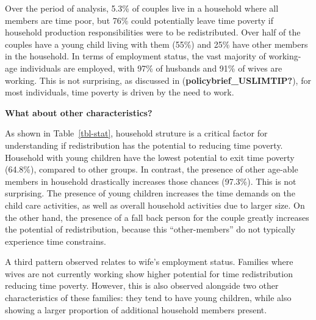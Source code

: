 \documentclass[
  11pt,
]{article}
\begin{document}
Over the period of analysis, 5.3\% of couples live in a household where
all members are time poor, but 76\% could potentially leave time poverty
if household production responsibilities were to be redistributed. Over
half of the couples have a young child living with them (55\%) and 25\%
have other members in the household. In terms of employment status, the
vast majority of working-age individuals are employed, with 97\% of
husbands and 91\% of wives are working. This is not surprising, as
discussed in (\textbf{policybrief\_USLIMTIP?}), for most individuals,
time poverty is driven by the need to work.

\textbf{What about other characteristics?}

As shown in Table~\ref{tbl-stat}, household struture is a critical
factor for understanding if redistribution has the potential to reducing
time poverty. Household with young children have the lowest potential to
exit time poverty (64.8\%), compared to other groups. In contrast, the
presence of other age-able members in household drastically increases
those chances (97.3\%). This is not surprising. The presence of young
children increases the time demands on the child care activities, as
well as overall household activities due to larger size. On the other
hand, the presence of a fall back person for the couple greatly
increases the potential of redistribution, because this
``other-members'' do not typically experience time constrains.

A third pattern observed relates to wife's employment status. Families
where wives are not currently working show higher potential for time
redistribution reducing time poverty. However, this is also observed
alongside two other characteristics of these families: they tend to have
young children, while also showing a larger proportion of additional
household members present.
\end{document}
